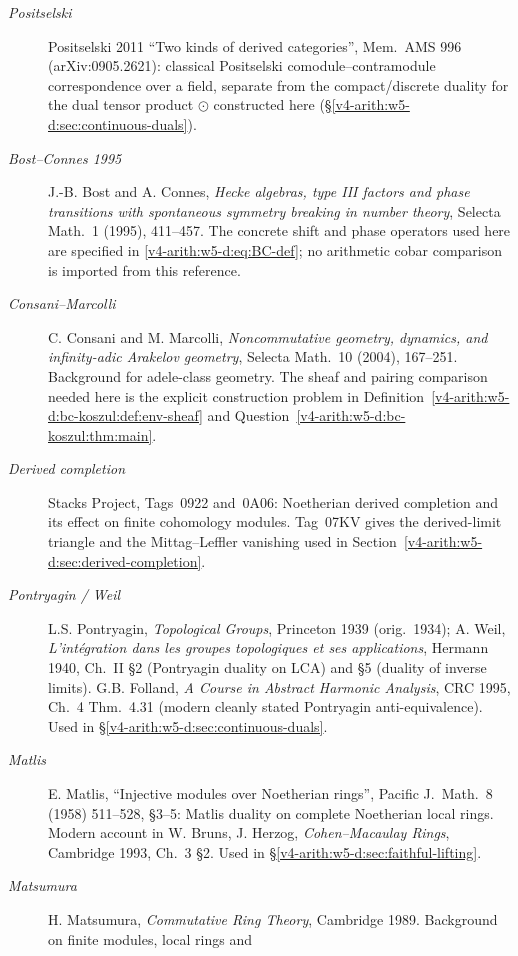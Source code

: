 \begin{description}
\item[\emph{Positselski}] Positselski 2011 ``Two kinds of derived
categories'', Mem.~AMS 996 (arXiv:0905.2621): classical Positselski
comodule--contramodule correspondence over a field, separate from the compact/discrete duality for the dual tensor
product \(\odot\) constructed here
(\S\ref{v4-arith:w5-d:sec:continuous-duals}). \item[\emph{Bost--Connes 1995}] J.-B. Bost and A. Connes,
\emph{Hecke algebras, type III factors and phase transitions with
spontaneous symmetry breaking in number theory}, Selecta Math.~1
(1995), 411--457. The concrete shift and phase operators used here are
specified in \eqref{v4-arith:w5-d:eq:BC-def}; no arithmetic cobar
comparison is imported from this reference.
\item[\emph{Consani--Marcolli}] C. Consani and M. Marcolli,
\emph{Noncommutative geometry, dynamics, and infinity-adic Arakelov
geometry}, Selecta Math.~10 (2004), 167--251. Background for adele-class
geometry. The sheaf and pairing comparison needed here is the explicit
construction problem in
Definition~\ref{v4-arith:w5-d:bc-koszul:def:env-sheaf} and Question~\ref{v4-arith:w5-d:bc-koszul:thm:main}.
\item[\emph{Derived completion}] Stacks Project, Tags~0922
and~0A06: Noetherian derived completion and its effect on finite
cohomology modules. Tag~07KV gives the derived-limit triangle
and the Mittag--Leffler vanishing used in
Section~\ref{v4-arith:w5-d:sec:derived-completion}.
\item[\emph{Pontryagin / Weil}] L.S. Pontryagin, \emph{Topological
Groups}, Princeton 1939 (orig.\ 1934); A. Weil, \emph{L'int\'egration
dans les groupes topologiques et ses applications}, Hermann 1940,
Ch.~II \S2 (Pontryagin duality on LCA) and \S5 (duality of inverse
limits). G.B. Folland, \emph{A Course in Abstract Harmonic Analysis},
CRC 1995, Ch.~4 Thm.~4.31 (modern cleanly stated Pontryagin
anti-equivalence). Used in
\S\ref{v4-arith:w5-d:sec:continuous-duals}.
\item[\emph{Matlis}] E. Matlis, ``Injective modules over Noetherian
rings'', Pacific J.~Math.~8 (1958) 511--528, \S3--5: Matlis duality
on complete Noetherian local rings. Modern account in
W. Bruns, J. Herzog, \emph{Cohen--Macaulay Rings}, Cambridge 1993,
Ch.~3 \S2. Used in \S\ref{v4-arith:w5-d:sec:faithful-lifting}.
\item[\emph{Matsumura}] H. Matsumura, \emph{Commutative Ring Theory},
Cambridge 1989. Background on finite modules, local rings and

\end{description}
